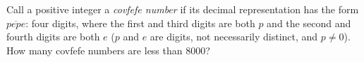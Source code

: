 Call a positive integer a \emph{covfefe number} if its decimal representation has the form $\overline{pepe}$: four digits, where the first and third digits are both $p$ and the second and fourth digits are both $e$ ($p$ and $e$ are digits, not necessarily distinct, and $p\ne0$). How many covfefe numbers are less than $8000$?
